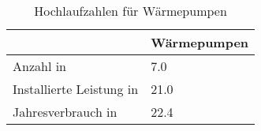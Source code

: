 {
\renewcommand{\arraystretch}{1.2}%
\begin{table}[H]
	\begin{center}
		\caption{Hochlaufzahlen für Wärmepumpen}
		\begin{tabu} to 0.55\textwidth {X[1.7] X[1, r]}
			\toprule
												& Wärmepumpen 	\\ \midrule
			Anzahl in \si{\MioStkSCtoo}     	& \num{7.0}  	\\
			Installierte Leistung in \si{\gw}	& \num{21.0}  	\\
			Jahresverbrauch in \si{\twh} 		& \num{22.4}  	\\ \bottomrule
		\end{tabu}
		\label{tab:WP-RampUp}
	\end{center}
	\vspace{-3mm}%
\end{table}
}